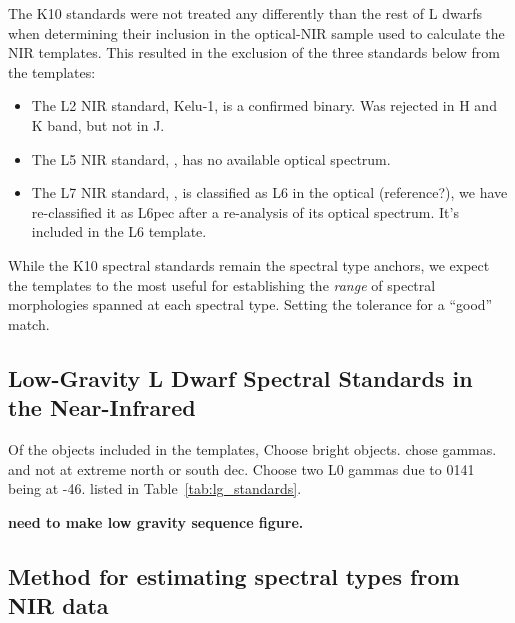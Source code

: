 \documentclass[12pt,preprint]{aastex}
\begin{document}
The K10 standards were not treated any differently than the rest of L dwarfs when determining their inclusion in the optical-NIR sample used to calculate the NIR templates. This resulted in the exclusion of the three standards below from the templates:
\begin{itemize}
	\item The L2 NIR standard,  Kelu-1, is a confirmed binary. Was rejected in H and K band, but not in J.
	\item The L5 NIR standard, , has no available optical spectrum. 
	\item The L7 NIR standard, , is classified as L6 in the optical (reference?), we have re-classified it as L6pec after a re-analysis of its optical spectrum. It's included in the L6 template.
\end{itemize}

While the K10 spectral standards remain the spectral type anchors, we expect the templates to the most useful for establishing the \emph{range} of spectral morphologies spanned at each spectral type.
Setting the tolerance for a ``good'' match.


\subsection{Low-Gravity L Dwarf Spectral Standards in the Near-Infrared}

Of the objects included in the templates, 
Choose bright objects. 
chose gammas.
and not at extreme north or south dec. Choose two L0 gammas due to 0141 being at -46.
listed in Table~\ref{tab:lg_standards}.

\textbf{need to make low gravity sequence figure.}


\subsection{Method for estimating spectral types from NIR data}
\end{document}
